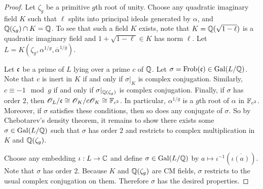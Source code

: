 \documentclass{amsart}
\begin{document}
\begin{proof}
    Let $\zeta_g$ be a primitive $g$th root of unity. Choose any quadratic imaginary field $K$ such that $\ell$ splits into principal ideals generated by $\alpha$, and $\mathbb{Q}(\zeta_g) \cap K = \mathbb{Q}$. To see that such a field $K$ exists, note that $K = \mathbb{Q}(\sqrt{1-\ell})$ is a quadratic imaginary field and $1 + \sqrt{1 - \ell} \in K$ has norm $\ell$. Let $L = K(\zeta_g,\alpha^{1/g},\overline{\alpha}^{1/g})$.


  Let $\frak{c}$ be a prime of $L$ lying over a prime $c$ of $\mathbb{Q}$. Let $\sigma = \mathrm{Frob}(\frak{c}) \in \operatorname{Gal}(L/\mathbb{Q})$. Note that $c$ is inert in $K$ if and only if $\sigma|_K$ is complex conjugation. Similarly, $c \equiv -1 \mod{g}$ if and only if $\sigma|_{\mathbb{Q}(\zeta_g)}$ is complex conjugation.
Finally, if $\sigma$ has order $2$, then $\mathscr{O}_L/\frak{c} \cong \mathscr{O}_K/c\mathscr{O}_K \cong \mathbb{F}_{c^2}$. In particular, $\alpha^{1/g}$ is a $g$th root of $\alpha$ in $\mathbb{F}_{c^2}$. Moreover, if $\sigma$ satisfies these conditions, then so does any conjugate of $\sigma$. So by Chebotarev's density theorem, it remains to show there exists some $\sigma \in \operatorname{Gal}(L/\mathbb{Q})$ such that $\sigma$ has order $2$ and restricts to complex multiplication in $K$ and $\mathbb{Q}(\zeta_g)$.

  Choose any embedding $\iota: L \to \mathbb{C}$ and define $\sigma \in \operatorname{Gal}(L/\mathbb{Q})$ by $a \mapsto \iota^{-1}(\overline{\iota(a)})$. Note that $\sigma$ has order $2$. Because $K$ and $\mathbb{Q}(\zeta_g)$ are CM fields, $\sigma$ restricts to the usual complex conjugation on them. Therefore $\sigma$ has the desired properties.
\end{proof}
\end{document}
